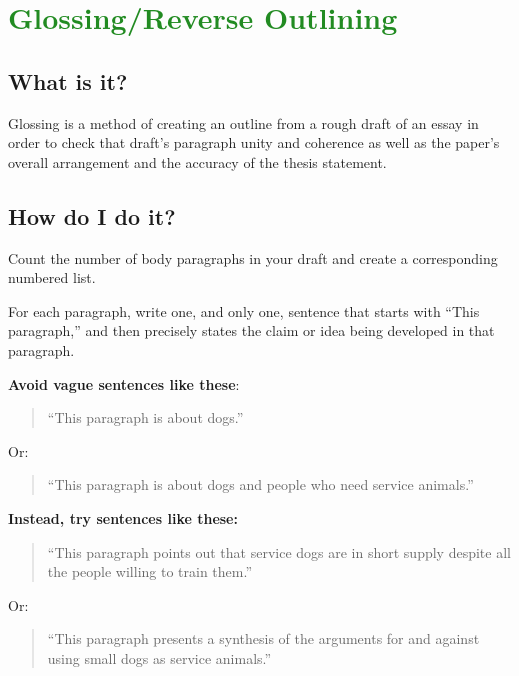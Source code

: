 
\section{\textcolor{ForestGreen}{Glossing/Reverse Outlining}}

\subsection{What is it?}

Glossing is a method of creating an outline from a rough draft of an essay in order to check that draft's paragraph unity and coherence as well as the paper's overall arrangement and the accuracy of the thesis statement.

\subsection{How do I do it?}

Count the number of body paragraphs in your draft and create a corresponding numbered list.

For each paragraph, write one, and only one, sentence that starts with ``This paragraph,'' and then  precisely states the claim or idea being developed in that paragraph.
        	
\textbf{Avoid vague sentences like these}:

\begin{quote} ``This paragraph is about dogs.'' \end{quote}

Or:

\begin{quote} ``This paragraph is about dogs and people who need service animals.'' \end{quote}
        	
\textbf{Instead, try sentences like these:}
                    	     	
\begin{quote} ``This paragraph points out that service dogs are in short supply despite all the people willing to train them.''\end{quote}
 
 Or:
                                	
\begin{quote} ``This paragraph presents a synthesis of the arguments for and against using  small dogs as service animals.'' \end{quote}
                 
